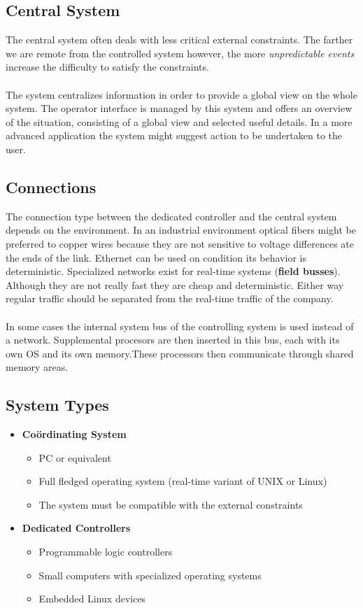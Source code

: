 \documentclass[../main.tex]{subfiles}
\begin{document}
\subsection{Central System}
The central system often deals with less critical external constraints. The farther we are remote from the controlled system however, the more \textit{unpredictable events} increase the difficulty to satisfy the constraints. 
\\\\
The system centralizes information in order to provide a global view on the whole system. The operator interface is managed by this system and offers an overview of the situation, consisting of a global view and selected useful details. In a more advanced application the system might suggest action to be undertaken to the user.

\subsection{Connections}
The connection type between the dedicated controller and the central system depends on the environment. In an industrial environment optical fibers might be preferred to copper wires because they are not sensitive to voltage differences ate the ends of the link. Ethernet can be used on condition its behavior is deterministic. Specialized networks exist for real-time systems (\textbf{field busses}). Although they are not really fast they are cheap and deterministic. Either way regular traffic should be separated from the  real-time traffic of the company. 
\\\\
In some cases the internal system bus of the controlling system is used instead of a network. Supplemental procesors are then inserted in this bus, each with its own OS and its own memory.These processors then communicate through shared memory areas.

\subsection{System Types}
\begin{itemize}
	\item \textbf{Co\"ordinating System}
	\begin{itemize}
		\item PC or equivalent
		\item Full fledged operating system (real-time variant of UNIX or Linux)
		\item The system must be compatible with the external constraints
	\end{itemize}
	\item \textbf{Dedicated Controllers}
	\begin{itemize}
		\item Programmable logic controllers
		\item Small computers with specialized operating systems
		\item Embedded Linux devices
	\end{itemize}
\end{itemize}
\end{document}
